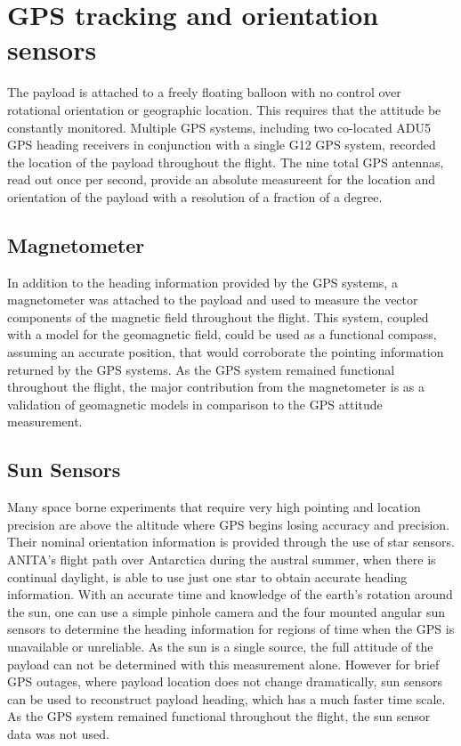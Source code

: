 	
\section{GPS tracking and orientation sensors}
	The payload is attached to a freely floating balloon with no control over rotational orientation or geographic location. This requires that the attitude be constantly monitored.  Multiple GPS systems, including two co-located ADU5 GPS heading receivers in conjunction with a single G12 GPS system, recorded the location of the payload throughout the flight.  The nine total GPS antennas, read out once per second, provide an absolute measureent for the location and orientation of the payload with a resolution of a fraction of a degree.
	
	\subsection{Magnetometer}
		In addition to the heading information provided by the GPS systems, a magnetometer was attached to the payload and used to measure the vector components of the magnetic field throughout the flight.  This system, coupled with a model for the geomagnetic field, could be used as a functional compass, assuming an accurate position, that would corroborate the pointing information returned by the GPS systems.  As the GPS system remained functional throughout the flight, the major contribution from the magnetometer is as a validation of geomagnetic models in comparison to the GPS attitude measurement.
		
	\subsection{Sun Sensors}
		Many space borne experiments that require very high pointing and location precision are above the altitude where GPS begins losing accuracy and precision.  Their nominal orientation information is provided through the use of star sensors.  ANITA's flight path over Antarctica during the austral summer, when there is continual daylight, is able to use just one star to obtain accurate heading information.  With an accurate time and knowledge of the earth's rotation around the sun, one can use a simple pinhole camera and the four mounted angular sun sensors to determine the heading information for regions of time when the GPS is unavailable or unreliable.  As the sun is a single source, the full attitude of the payload can not be determined with this measurement alone. However for brief GPS outages, where payload location does not change dramatically, sun sensors can be used to reconstruct payload heading, which has a much faster time scale.  As the GPS system remained functional throughout the flight, the sun sensor data was not used.
		
